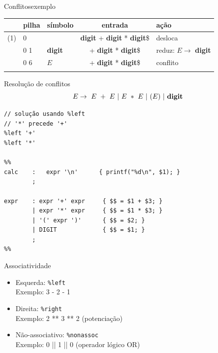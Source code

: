 \begin{frame}{Conflitos}{exemplo}
\centering\small
  \bigskip

  \scriptsize
  \begin{tabular}[h]{r|l|l|c|l}
    \toprule
    & \hfil pilha &\hfil símbolo & entrada &\hfil ação \\
    \midrule
    (1) & 0 &  &\hfill {\bf digit} + {\bf digit} * {\bf digit}\$& desloca \\
    \only<2->{
    (2) & 0 1 &   {\bf digit} &\hfill + {\bf digit} * {\bf digit}\$ & reduz: $E\rightarrow$ {\bf digit} \\
    }
    \only<3->{
    (3) & 0 6 &   $E$ &\hfill + {\bf digit} * {\bf digit}\$ & {\large\color{red}conflito} \\
    }
    & & & &\\
   \bottomrule
  \end{tabular}
\end{frame}

\begin{frame}[fragile]{Resolução de conflitos}
  $$E \rightarrow\ E\ +\ E\ |\ E\ *\ E\ |\ (E)\ |\ \text{\bf digit} $$

  \small

\begin{lstlisting}
// solução usando %left
// '*' precede '+'
%left '+'
%left '*'

%%
calc    :   expr '\n'      { printf("%d\n", $1); }
        ;

expr    : expr '+' expr     { $$ = $1 + $3; }
        | expr '*' expr     { $$ = $1 * $3; }
        | '(' expr ')'      { $$ = $2; }
        | DIGIT             { $$ = $1; }
        ;
%%
\end{lstlisting}
\end{frame}

\begin{frame}{Associatividade}

  \begin{itemize}
    \item Esquerda: {\tt \%left}\\
      Exemplo: 3 - 2 - 1
     \bigskip
    \item Direita:  {\tt \%right}\\
     Exemplo: 2  ** 3 ** 2 \hfil (potenciação)
     \bigskip
    \item Não-associativo: {\tt \%nonassoc}\\
      Exemplo: 0 || 1 || 0  \hfil (operador lógico OR)
  \end{itemize}
\end{frame}


